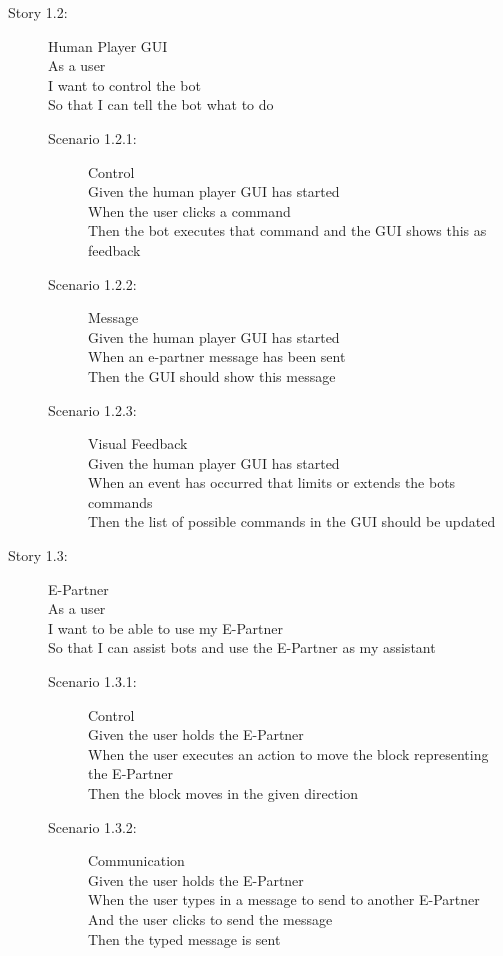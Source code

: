\documentclass{article}
\begin{document}
\begin{description}
	\item[Story 1.2:] Human Player GUI\\
	As a user \\
	I want to control the bot\\
	So that I can tell the bot what to do

	\begin{description}
		\item[Scenario 1.2.1:] Control\\
		Given the human player GUI has started\\
		When the user clicks a command\\
		Then the bot executes that command and the GUI shows this as feedback

		\item[Scenario 1.2.2:] Message\\
		Given the human player GUI has started\\
		When an e-partner message has been sent\\
		Then the GUI should show this message

		\item[Scenario 1.2.3:] Visual Feedback\\
		Given the human player GUI has started\\
		When an event has occurred that limits or extends the bots commands\\
		Then the list of possible commands in the GUI should be updated
	\end{description}
\end{description}
\begin{description}
	\item[Story 1.3:] E-Partner\\
	As a user\\
	I want to be able to use my E-Partner\\
	So that I can assist bots and use the E-Partner as my assistant

	\begin{description}
		\item[Scenario 1.3.1:] Control\\
		Given the user holds the E-Partner\\
		When the user executes an action to move the block representing the E-Partner\\
		Then the block moves in the given direction
		
		\item[Scenario 1.3.2:] Communication\\
		Given the user holds the E-Partner\\
		When the user types in a message to send to another E-Partner\\
		And the user clicks to send the message\\
		Then the typed message is sent
	\end{description}
\end{description}
\end{document}
